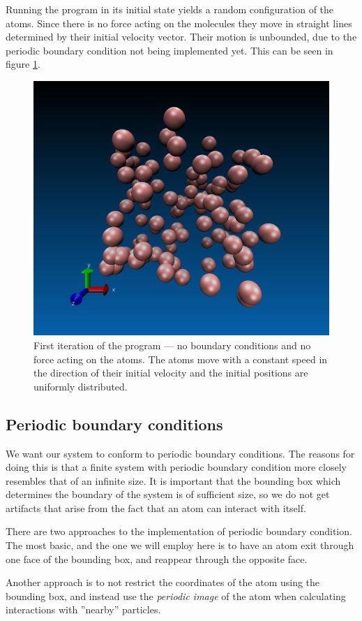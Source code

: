 \documentclass[a4paper]{article}
\begin{document}
    Running the program in its initial state yields a random configuration of
    the atoms. Since there is no force acting on the molecules they move in
    straight lines determined by their initial velocity vector. Their motion is
    unbounded, due to the periodic boundary condition not being implemented
    yet. This can be seen in figure \ref{fig:first_iteration}.

    \begin{figure}
        \centering \includegraphics[width=0.4\linewidth]{first_iteration.png}
        \caption[Initial state of the program]{First iteration of the program --- no boundary conditions and
            no force acting on the atoms. The atoms move with a constant speed
            in the direction of their initial velocity and the initial
        positions are uniformly distributed.}
        \label{fig:first_iteration}
    \end{figure}

\subsection{Periodic boundary conditions}
\label{sub:periodic_boundary_conditions}
        
    We want our system to conform to periodic boundary conditions. The reasons
    for doing this is that a finite system with periodic boundary condition
    more closely resembles that of an infinite size. It is important that the
    bounding box which determines the boundary of the system is of sufficient
    size, so we do not get artifacts that arise from the fact that an atom can
    interact with itself. 
    
    There are two approaches to the implementation of periodic boundary
    condition. The most basic, and the one we will employ here is to have an
    atom exit through one face of the bounding box, and reappear through the
    opposite face. 

    Another approach is to not restrict the coordinates of the atom using the
    bounding box, and instead use the \emph{periodic image} of the atom when
    calculating interactions with ''nearby'' particles.
    
\end{document}
